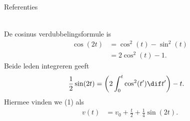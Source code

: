 \begin{frame}[fragile]{Referenties}
\begin{columns}
\begin{column}{0.5\textwidth}
\begin{onlyenv}
{\begin{align}
                \end{align}
                De cosinus verdubbelingsformule is
                \begin{align*}
                    \cos(2t) &= \cos^2(t) - \sin^2(t)\\
                    &= 2\cos^2(t)-1.
                \end{align*}
                Beide leden integreren geeft
                \begin{align*}
                    \frac{1}{2}\sin(2t) &= \left(2\int_0^t\cos^2(t')\dif t'\right) - t.
                \end{align*}
                Hiermee vinden we (1) als
                \begin{align*}
                    v(t) &= v_0 + \frac{t}{2} + \frac{1}{4}\sin(2t).
                \end{align*}
                }
            \end{onlyenv}
        \end{column}
    \end{columns}
\end{frame}




        
    


